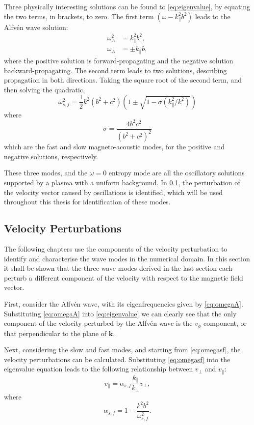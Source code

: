 \documentclass[a4paper,12pt,fourier,authoryear,custommargin]{Classes/PhDThesisPSnPDF}
\renewcommand{\vec}{\mathbf}
\begin{document}
Three physically interesting solutions can be found to \cref{eq:eigenvalue}, by equating the two terms, in brackets, to zero.
The first term $(\omega - k_\parallel^2 b^2)$ leads to the Alfv\'en wave solution:
\begin{align}
\omega^2_A &= k^2_\parallel b^2,\\
\omega_A &= \pm k_\parallel b,
\label{eq:omegaA}
\end{align}
where the positive solution is forward-propagating and the negative solution backward-propagating.
The second term leads to two solutions, describing propagation in both directions. 
Taking the square root of the second term, and then solving the quadratic,
\begin{equation}
    \omega^2_{s,f} = \frac{1}{2}k^2(b^2+c^2)\left(1 \pm \sqrt{1 - \sigma (k^2_\parallel/k^2)}\right)
    \label{eq:omegasf}
\end{equation}
where
\begin{equation}
    \sigma=\frac{4b^2c^2}{(b^2 + c^2)^2}
    \label{eq:sigmasf}
\end{equation}
which are the fast and slow magneto-acoustic modes, for the positive and negative solutions, respectively.

These three modes, and the $\omega = 0$ entropy mode are all the oscillatory solutions supported by a plasma with a uniform background.
In \cref{sec:Vpert}, the perturbation of the velocity vector caused by oscillations is identified, which will be used throughout this thesis for identification of these modes.


\subsection{Velocity Perturbations}\label{sec:Vpert}

The following chapters use the components of the velocity perturbation to identify and characterise the wave modes in the numerical domain.
In this section it shall be shown that the three wave modes derived in the last section each perturb a different component of the velocity with respect to the magnetic field vector.

First, consider the Alfv\'en wave, with its eigenfrequencies given by \cref{eq:omegaA}.
Substituting \cref{eq:omegaA} into \cref{eq:eigenvalue} we can clearly see that the only component of the velocity perturbed by the Alfv\'en wave is the $v_\phi$ component, or that perpendicular to the plane of $\vec{k}$.

Next, considering the slow and fast modes, and starting from \cref{eq:omegasf}, the velocity perturbations can be calculated.
Substituting \cref{eq:omegasf} into the eigenvalue equation leads to the following relationship between $v_\perp$ and $v_\parallel$:
\begin{equation}
    v_\parallel = \alpha_{s,f} \frac{k_\parallel}{k_\perp}v_\perp,
    \label{eq:vyvz}
\end{equation}
where
\begin{equation}
    \alpha_{s,f} = 1 - \frac{k^2b^2}{\omega^2_{s,f}}.
    \label{eq:alphasf}
\end{equation}
\end{document}

